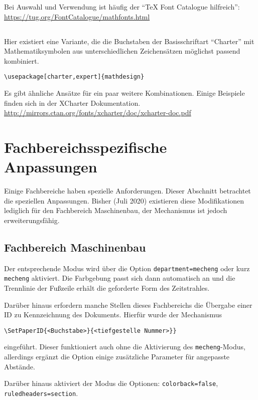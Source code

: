\documentclass[
	ngerman,
	accentcolor=9c,%
	]{tudapub}
\let\code\texttt
\begin{document}
Bei Auswahl und Verwendung ist häufig der \enquote{\TeX{} Font Catalogue hilfreich}: \url{https://tug.org/FontCatalogue/mathfonts.html}

\subsection{}
Hier existiert eine Variante, die die Buchstaben der Basisschriftart \enquote{Charter} mit Mathematiksymbolen aus unterschiedlichen Zeichensätzen möglichst passend kombiniert.

\begin{verbatim}
\usepackage[charter,expert]{mathdesign}
\end{verbatim}

Es gibt ähnliche Ansätze für ein paar weitere Kombinationen. Einige Beispiele finden sich in der XCharter Dokumentation. \url{http://mirrors.ctan.org/fonts/xcharter/doc/xcharter-doc.pdf}


\section{Fachbereichsspezifische Anpassungen}
Einige Fachbereiche haben spezielle Anforderungen. Dieser Abschnitt betrachtet die speziellen Anpassungen. Bisher (Juli 2020) existieren diese Modifikationen lediglich für den Fachbereich Maschinenbau, der Mechanismus ist jedoch erweiterungsfähig.


\subsection{Fachbereich Maschinenbau}
Der entsprechende Modus wird über die Option \code{department=mecheng} oder kurz \code{mecheng} aktiviert. Die Farbgebung passt sich dann automatisch an und die Trennlinie der Fußzeile erhält die geforderte Form des Zeitstrahles. 

Darüber hinaus erfordern manche Stellen dieses Fachbereichs die Übergabe einer ID zu Kennzeichnung des Dokuments. Hierfür wurde der Mechanismus
\begin{verbatim}
\SetPaperID{<Buchstabe>}{<tiefgestelle Nummer>}}
\end{verbatim}
eingeführt.
Dieser funktioniert auch ohne die Aktivierung des \code{mecheng}-Modus, allerdings ergänzt die Option einige zusätzliche Parameter für angepasste Abstände.

Darüber hinaus aktiviert der Modus die Optionen:
\code{colorback=false}, \code{ruledheaders=section}.
\end{document}
